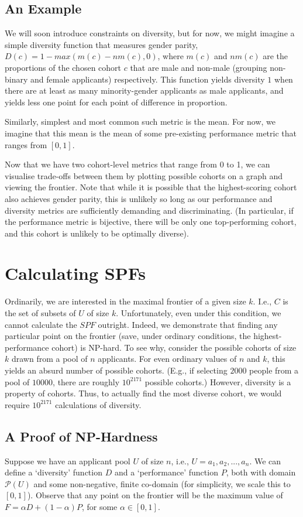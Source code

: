 \subsection{An Example}
We will soon introduce constraints on diversity, but for now, we might imagine a simple diversity function that measures gender parity, $D(c) = 1 - max(m(c) - nm(c), 0)$, where $m(c)$ and $nm(c)$ are the proportions of the chosen cohort $c$ that are male and non-male (grouping non-binary and female applicants) respectively. This function yields diversity $1$ when there are at least as many minority-gender applicants as male applicants, and yields less one point for each point of difference in proportion.

Similarly, simplest and most common such metric is the mean. For now, we imagine that this mean is the mean of some pre-existing performance metric that ranges from $[0,1]$.

Now that we have two cohort-level metrics that range from 0 to 1, we can visualise trade-offs between them by plotting possible cohorts on a graph and viewing the frontier. Note that while it is possible that the highest-scoring cohort also achieves gender parity, this is unlikely so long as our performance and diversity metrics are sufficiently demanding and discriminating. (In particular, if the performance metric is bijective, there will be only one top-performing cohort, and this cohort is unlikely to be optimally diverse).

\section{Calculating SPFs}\label{sec:spf_alg}
Ordinarily, we are interested in the maximal frontier of a given size $k$. I.e., $C$ is the set of subsets of $U$ of size $k$. Unfortunately, even under this condition, we cannot calculate the $SPF$ outright. Indeed, we demonstrate that finding any particular point on the frontier (save, under ordinary conditions, the highest-performance cohort) is NP-hard. To see why, consider the possible cohorts of size $k$ drawn from a pool of $n$ applicants. For even ordinary values of $n$ and $k$, this yields an absurd number of possible cohorts. (E.g., if selecting $2000$ people from a pool of $10000$, there are roughly $10^{2171}$ possible cohorts.) However, diversity is a property of cohorts. Thus, to actually find the most diverse cohort, we would require $10^{2171}$ calculations of diversity.

\subsection{A Proof of NP-Hardness}
Suppose we have an applicant pool $U$ of size $n$, i.e., $U = {a_1, a_2, ..., a_n}$. We can define a `diversity' function $D$ and a `performance' function $P$, both with domain $\mathcal{P} (U)$ and some non-negative, finite co-domain (for simplicity, we scale this to $[0, 1]$). Observe that any point on the frontier will be the maximum value of $F = \alpha D + (1 - \alpha) P$, for some $\alpha \in [0, 1]$.

